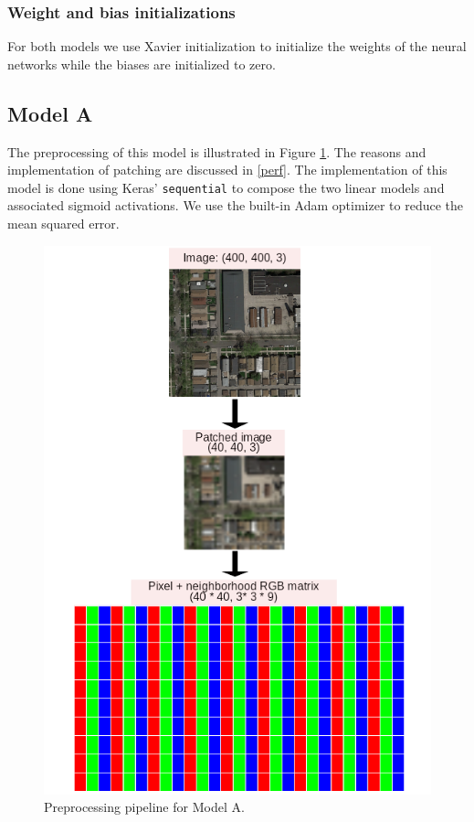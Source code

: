 \documentclass[10pt,conference,compsocconf]{IEEEtran}
\begin{document}
\subsubsection{Weight and bias initializations}
For both models we use Xavier\cite{xavier-init} initialization to initialize the weights of the neural networks while the biases are initialized to zero.

\subsection{Model A}
The preprocessing of this model is illustrated in Figure \ref{fig:mlp-preproc}. The reasons and implementation of patching are discussed in \ref{perf}. 
The implementation of this model is done using Keras' \texttt{sequential} to compose the two linear models and associated sigmoid activations.
We use the built-in Adam optimizer to reduce the mean squared error.

\begin{figure}[t]
  \centering
  \includegraphics[height=0.7\columnwidth]{mlp-preprocessing-schema.png}
  \caption{Preprocessing pipeline for Model A.}
  \vspace{-3mm}
  \label{fig:mlp-preproc}
\end{figure}
\end{document}
